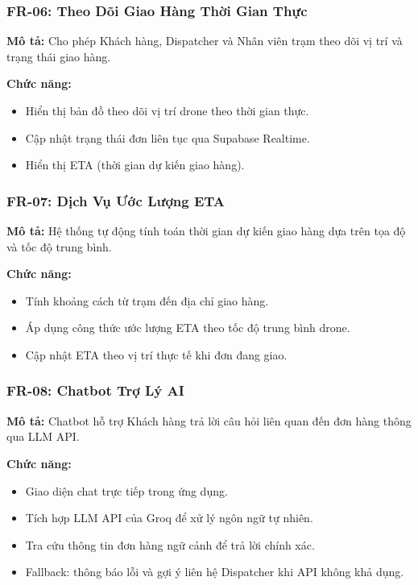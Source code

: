 \subsubsection{FR-06: Theo Dõi Giao Hàng Thời Gian Thực}
\textbf{Mô tả:} Cho phép Khách hàng, Dispatcher và Nhân viên trạm theo dõi vị trí và trạng thái giao hàng.

\textbf{Chức năng:}
\begin{itemize}
  \item Hiển thị bản đồ theo dõi vị trí drone theo thời gian thực.
  \item Cập nhật trạng thái đơn liên tục qua Supabase Realtime.
  \item Hiển thị ETA (thời gian dự kiến giao hàng).
\end{itemize}

\subsubsection{FR-07: Dịch Vụ Ước Lượng ETA}
\textbf{Mô tả:} Hệ thống tự động tính toán thời gian dự kiến giao hàng dựa trên tọa độ và tốc độ trung bình.

\textbf{Chức năng:}
\begin{itemize}
  \item Tính khoảng cách từ trạm đến địa chỉ giao hàng.
  \item Áp dụng công thức ước lượng ETA theo tốc độ trung bình drone.
  \item Cập nhật ETA theo vị trí thực tế khi đơn đang giao.
\end{itemize}

\subsubsection{FR-08: Chatbot Trợ Lý AI}
\textbf{Mô tả:} Chatbot hỗ trợ Khách hàng trả lời câu hỏi liên quan đến đơn hàng thông qua LLM API.

\textbf{Chức năng:}
\begin{itemize}
  \item Giao diện chat trực tiếp trong ứng dụng.
  \item Tích hợp LLM API của Groq để xử lý ngôn ngữ tự nhiên.
  \item Tra cứu thông tin đơn hàng ngữ cảnh để trả lời chính xác.
  \item Fallback: thông báo lỗi và gợi ý liên hệ Dispatcher khi API không khả dụng.
\end{itemize}

